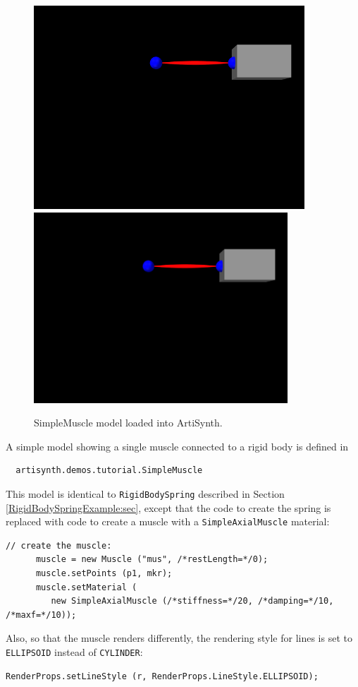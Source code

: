 \begin{figure}[ht]
\begin{center}
\iflatexml
 \includegraphics[]{images/SimpleMuscle}
\else
 \includegraphics[width=3.75in]{images/SimpleMuscle}
\fi
\end{center}
\caption{SimpleMuscle model loaded into ArtiSynth.}
\label{SimpleMuscle:fig}
\end{figure}

A simple model showing a single muscle connected to a rigid
body is defined in
%
\begin{verbatim}
  artisynth.demos.tutorial.SimpleMuscle
\end{verbatim}
%

This model is identical to {\tt RigidBodySpring} described in Section
\ref{RigidBodySpringExample:sec}, except that the code to create
the spring is replaced with code to create a muscle
with a {\tt SimpleAxialMuscle} material:
%
\begin{lstlisting}[]
      // create the muscle:      
      muscle = new Muscle ("mus", /*restLength=*/0);
      muscle.setPoints (p1, mkr);
      muscle.setMaterial (
         new SimpleAxialMuscle (/*stiffness=*/20, /*damping=*/10, /*maxf=*/10));
\end{lstlisting}
%
Also, so that the muscle renders differently, the rendering style
for lines is set to {\tt ELLIPSOID} instead of {\tt CYLINDER}:
%
\begin{lstlisting}[]
      RenderProps.setLineStyle (r, RenderProps.LineStyle.ELLIPSOID);
\end{lstlisting}
%

